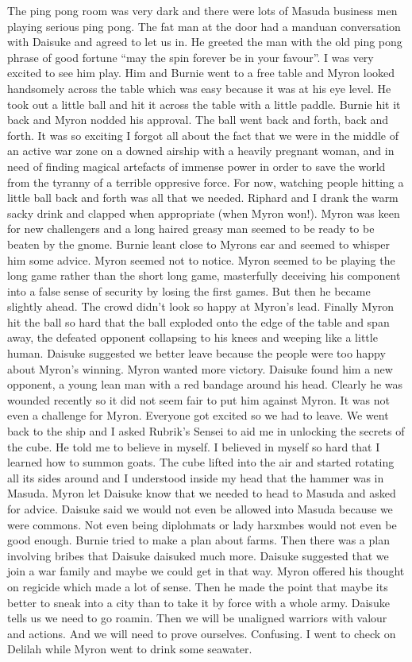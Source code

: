 The ping pong room was very dark and there were lots of Masuda business men playing serious ping pong. The fat man at the door had a manduan conversation with Daisuke and agreed to let us in. He greeted the man with the old ping pong phrase of good fortune “may the spin forever be in your favour”. I was very excited to see him play. Him and Burnie went to a free table and Myron looked handsomely across the table which was easy because it was at his eye level. He took out a little ball and hit it across the table with a little paddle. Burnie hit it back and Myron nodded his approval. The ball went back and forth, back and forth. It was so exciting I forgot all about the fact that we were in the middle of an active war zone on a downed airship with a heavily pregnant woman, and in need of finding magical artefacts of immense power in order to save the world from the tyranny of a terrible oppresive force. For now, watching people hitting a little ball back and forth was all that we needed. Riphard and I drank the warm sacky drink and clapped when appropriate (when Myron won!). Myron was keen for new challengers and a long haired greasy man seemed to be ready to be beaten by the gnome. Burnie leant close to Myrons ear and seemed to whisper him some advice. Myron seemed not to notice. Myron seemed to be playing the long game rather than the short long game, masterfully deceiving his component into a false sense of security by losing the first games. But then he became slightly ahead. The crowd didn’t look so happy at Myron’s lead. Finally Myron hit the ball so hard that the ball exploded onto the edge of the table and span away, the defeated opponent collapsing to his knees and weeping like a little human. Daisuke suggested we better leave because the people were too happy about Myron’s winning. Myron wanted more victory. Daisuke found him a new opponent, a young lean man with a red bandage around his head. Clearly he was wounded recently so it did not seem fair to put him against Myron. It was not even a challenge for Myron. Everyone got excited so we had to leave.\medskip
We went back to the ship and I asked Rubrik’s Sensei to aid me in unlocking the secrets of the cube. He told me to believe in myself. I believed in myself so hard that I learned how to summon goats. The cube lifted into the air and started rotating all its sides around and I understood inside my head that the hammer was in Masuda. Myron let Daisuke know that we needed to head to Masuda and asked for advice. Daisuke said we would not even be allowed into Masuda because we were commons. Not even being diplohmats or lady harxmbes would not even be good enough. Burnie tried to make a plan about farms. Then there was a plan involving bribes that Daisuke daisuked much more. Daisuke suggested that we join a war family and maybe we could get in that way. Myron offered his thought on regicide which made a lot of sense. Then he made the point that maybe its better to sneak into a city than to take it by force with a whole army. Daisuke tells us we need to go roamin. Then we will be unaligned warriors with valour and actions. And we will need to prove ourselves. Confusing. I went to check on Delilah while Myron went to drink some seawater.\medskip
